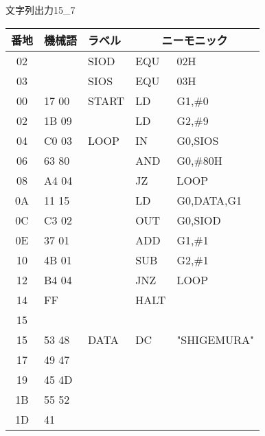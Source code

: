 \begin{reidai}{文字列出力1}{5_7}
  {\ttfamily\footnotesize\begin{center}
    \begin{tabular}{|c|l|l|l l|} \hline
      番地 & 機械語 & ラベル & \multicolumn{2}{|c|}{ニーモニック} \\
      \hline
      02 &        & SIOD   & EQU    & 02H            \\
      03 &        & SIOS   & EQU    & 03H            \\
      00 & 17 00  & START  & LD     & G1,\#0         \\
      02 & 1B 09  &        & LD     & G2,\#9         \\
      04 & C0 03  & LOOP   & IN     & G0,SIOS        \\
      06 & 63 80  &        & AND    & G0,\#80H       \\
      08 & A4 04  &        & JZ     & LOOP           \\
      0A & 11 15  &        & LD     & G0,DATA,G1     \\
      0C & C3 02  &        & OUT    & G0,SIOD        \\
      0E & 37 01  &        & ADD    & G1,\#1         \\
      10 & 4B 01  &        & SUB    & G2,\#1         \\
      12 & B4 04  &        & JNZ    & LOOP           \\
      14 & FF     &        & HALT   &                \\
      15 &        &        &        &                \\
      15 & 53 48  & DATA   & DC     & "SHIGEMURA"    \\
      17 & 49 47  &        &        &                \\
      19 & 45 4D  &        &        &                \\
      1B & 55 52  &        &        &                \\
      1D & 41     &        &        &                \\
      \hline
    \end{tabular}
  \end{center}}
\end{reidai}

